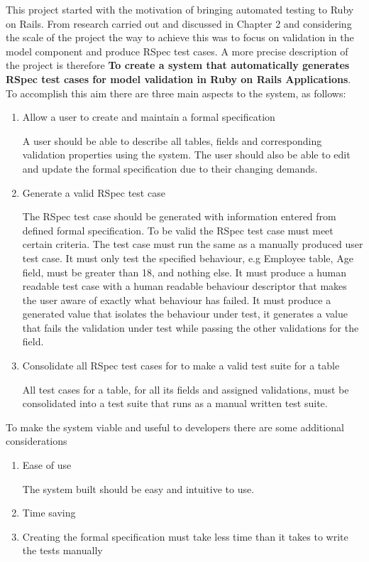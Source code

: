 \documentclass[a4paper,12pt]{article}
\begin{document}
\par This project started with the motivation of bringing automated testing to Ruby on Rails. From research carried out and discussed in Chapter 2 and considering the scale of the project the way to achieve this was to focus on validation in the model component and produce RSpec test cases. A more precise description of the project is therefore \textbf{To create a system that automatically generates RSpec test cases for model validation in Ruby on Rails Applications}. To accomplish this aim there are three main aspects to the system, as follows:
\vspace{3mm}
\begin{enumerate}
\item Allow a user to create and maintain a formal specification
\par A user should be able to describe all tables, fields and corresponding validation properties using the system. The user should also be able to edit and update the formal specification due to their changing demands.
\item Generate a valid RSpec test case
\par The RSpec test case should be generated with information entered from defined formal specification. To be valid the RSpec test case must meet certain criteria. The test case must run the same as a manually produced user test case. It must only test the specified behaviour, e.g Employee table, Age field, must be greater than 18, and nothing else. It must produce a human readable test case with a human readable  behaviour descriptor that makes the user aware of exactly what behaviour has failed. It must produce a generated value that isolates the behaviour under test, it generates a value that fails the validation under test while passing the other validations for the field.
\item Consolidate all RSpec test cases for to make a valid test suite for a table
\par All test cases for a table, for all its fields and assigned validations, must be consolidated into a test suite that runs as a manual written test suite.
\end{enumerate}
\vspace{3mm}
\par To make the system viable and useful to developers there are some additional considerations
\begin{enumerate}
\item Ease of use
\par The system built should be easy and intuitive to use. 
\item Time saving
\item Creating the formal specification must take less time than it takes to write the tests manually
\end{enumerate}
\end{document}
